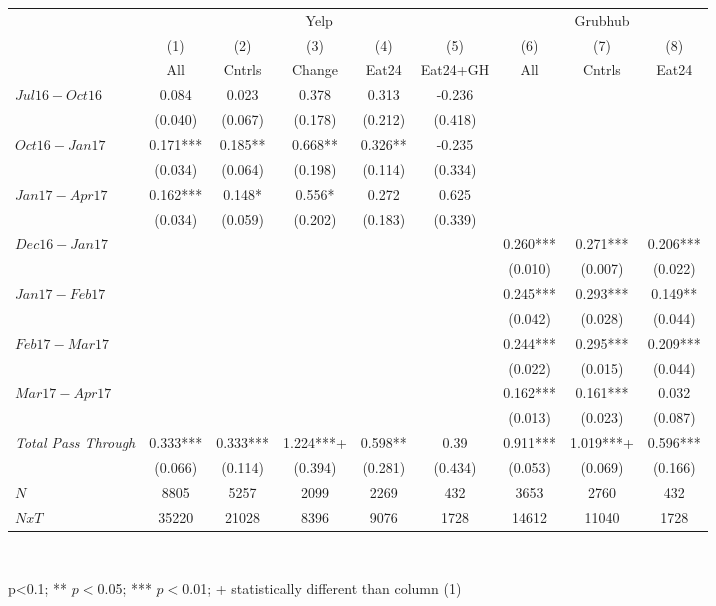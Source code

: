 \begin{center}
\begin{tabular}{lcccccccc}
\hline  & \multicolumn{5}{c}{Yelp} & \multicolumn{3}{c}{Grubhub}\\
 & (1) & (2) & (3) & (4) & (5) & (6) & (7) & (8)\\
 & All & Cntrls & Change & Eat24 & Eat24+GH & All & Cntrls & Eat24\\
\hline  $ Jul16-Oct16 $  & 0.084 & 0.023 & 0.378 & 0.313 & -0.236 &  &  & \\
 & (0.040) & (0.067) & (0.178) & (0.212) & (0.418) &  &  & \\
 $ Oct16-Jan17 $  & 0.171*** & 0.185** & 0.668** & 0.326** & -0.235 &  &  & \\
 & (0.034) & (0.064) & (0.198) & (0.114) & (0.334) &  &  & \\
 $ Jan17-Apr17 $  & 0.162*** & 0.148* & 0.556* & 0.272 & 0.625 &  &  & \\
 & (0.034) & (0.059) & (0.202) & (0.183) & (0.339) &  &  & \\
\hline  $ Dec16-Jan17 $  &  &  &  &  &  & 0.260*** & 0.271*** & 0.206***\\
 &  &  &  &  &  & (0.010) & (0.007) & (0.022)\\
 $ Jan17-Feb17 $  &  &  &  &  &  & 0.245*** & 0.293*** & 0.149**\\
 &  &  &  &  &  & (0.042) & (0.028) & (0.044)\\
 $ Feb17-Mar17 $  &  &  &  &  &  & 0.244*** & 0.295*** & 0.209***\\
 &  &  &  &  &  & (0.022) & (0.015) & (0.044)\\
 $ Mar17-Apr17 $  &  &  &  &  &  & 0.162*** & 0.161*** & 0.032\\
 &  &  &  &  &  & (0.013) & (0.023) & (0.087)\\
\hline \textit{Total Pass Through} & 0.333*** & 0.333*** & 1.224***+ & 0.598** & 0.39 & 0.911*** & 1.019***+ & 0.596***\\
  & (0.066) & (0.114) & (0.394) & (0.281) & (0.434) & (0.053) & (0.069) & (0.166)\\
\hline  $ N $  & 8805 & 5257 & 2099 & 2269 & 432 & 3653 & 2760 & 432\\
 $ NxT $  & 35220 & 21028 & 8396 & 9076 & 1728 & 14612 & 11040 & 1728\\
\hline\end{tabular}\\
\begin{tiny}p<0.1; ** $p<0$.05; *** $p<0$.01; + statistically different than column (1) \end{tiny}\\
\end{center}
